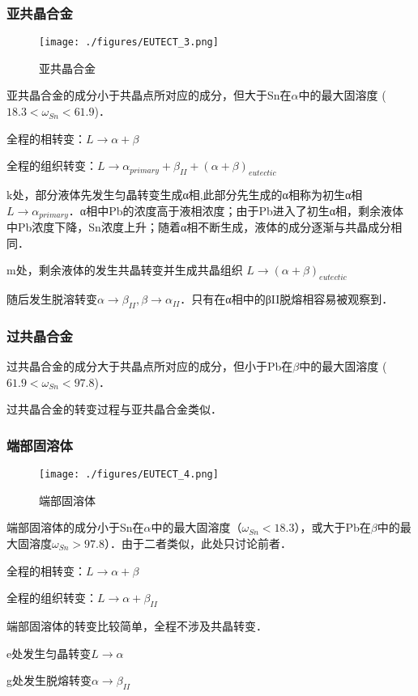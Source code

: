 \subsubsection{亚共晶合金}
\begin{figure}[ht]
\centering
\texttt{[image: ./figures/EUTECT\_3.png]}
\caption{亚共晶合金} \label{EUTECT_fig3}
\end{figure}

亚共晶合金的成分小于共晶点所对应的成分，但大于Sn在$\alpha$中的最大固溶度 ($18.3<\omega_{Sn}<61.9$)．

全程的相转变：$L \rightarrow \alpha+\beta$

全程的组织转变：$L \rightarrow \alpha_{primary}+\beta_{II}+(\alpha+\beta)_{eutectic}$

k处，部分液体先发生匀晶转变生成α相,此部分先生成的α相称为初生α相$L \rightarrow \alpha_{primary}$．α相中Pb的浓度高于液相浓度；由于Pb进入了初生α相，剩余液体中Pb浓度下降，Sn浓度上升；随着α相不断生成，液体的成分逐渐与共晶成分相同．

m处，剩余液体的发生共晶转变并生成共晶组织 $L \rightarrow (\alpha+\beta)_{eutectic}$

随后发生脱溶转变$\alpha \rightarrow \beta_{II}, \beta \rightarrow \alpha_{II}$．只有在α相中的βII脱熔相容易被观察到．

\subsubsection{过共晶合金}
过共晶合金的成分大于共晶点所对应的成分，但小于Pb在$\beta$中的最大固溶度 ($61.9<\omega_{Sn}<97.8$)．

过共晶合金的转变过程与亚共晶合金类似．

\subsubsection{端部固溶体}
\begin{figure}[ht]
\centering
\texttt{[image: ./figures/EUTECT\_4.png]}
\caption{端部固溶体} \label{EUTECT_fig4}
\end{figure}
端部固溶体的成分小于Sn在$\alpha$中的最大固溶度（$\omega_{Sn}<18.3$），或大于Pb在$\beta$中的最大固溶度$\omega_{Sn}>97.8$）．由于二者类似，此处只讨论前者．

全程的相转变：$L \rightarrow \alpha+\beta$

全程的组织转变：$L \rightarrow \alpha+ \beta_{II}$

端部固溶体的转变比较简单，全程不涉及共晶转变．

e处发生匀晶转变$L \rightarrow \alpha$

g处发生脱熔转变$\alpha \rightarrow \beta_{II}$